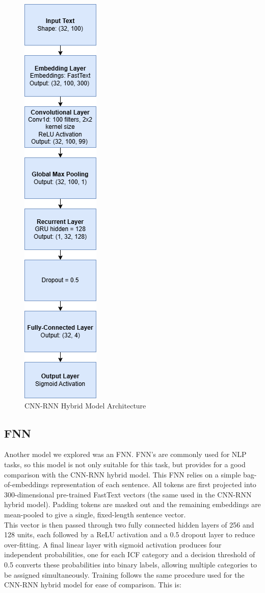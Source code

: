 \begin{figure}
    \centering
    \includegraphics[width=0.1\linewidth]{myReport/figures/CNN-RNN.drawio.png}
    \caption{CNN-RNN Hybrid Model Architecture}
    \label{fig:cnn-rnn-arch}
\end{figure}

 
\subsection{FNN}
Another model we explored was an FNN. FNN's are commonly used for NLP tasks, so this model is not only suitable for this task, but provides for a good comparison with the CNN-RNN hybrid model. This FNN relies on a simple bag-of-embeddings representation of each sentence. All tokens are first projected into 300-dimensional pre-trained FastText vectors (the same used in the CNN-RNN hybrid model). Padding tokens are masked out and the remaining embeddings are mean-pooled to give a single, fixed-length sentence vector. \\

This vector is then passed through two fully connected hidden layers of 256 and 128 units, each followed by a ReLU activation and a 0.5 dropout layer to reduce over-fitting. A final linear layer with sigmoid activation produces four independent probabilities, one for each ICF category and a decision threshold of 0.5 converts these probabilities into binary labels, allowing multiple categories to be assigned simultaneously. Training follows the same procedure used for the CNN-RNN hybrid model for ease of comparison. This is:

